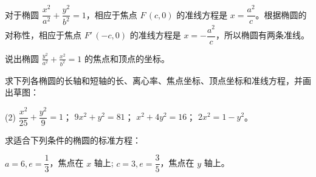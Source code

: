 对于椭圆 $\dfrac{x^2}{a^2}+\dfrac{y^2}{b^2}=1$，相应于焦点 $F\,(c,0)$ 的准线方程是 $x=\dfrac{a^2}{c}$。根据椭圆的对称性，相应于焦点 $F'\,(-c,0)$ 的准线方程是 $x=- \dfrac{a^2}{c}$，所以椭圆有两条准线。

\begin{Practice}
  \begin{question}
    \item 说出椭圆 $\frac{y^2}{a^2}+\frac{x^2}{b^2}=1$ 的焦点和顶点的坐标。
    \item 求下列各椭圆的长轴和短轴的长、离心率、焦点坐标、顶点坐标和准线方程，并画出草图：
    \begin{tasks}(2)
      \task $\dfrac{x^2}{25}+\dfrac{y^2}{9}=1$；
      \task $9x^2+y^2=81$；
      \task $x^2+4y^2=16$；
      \task $2x^2=1-y^2$。
    \end{tasks}
    \item 求适合下列条件的椭圆的标准方程：
    \begin{tasks}
      \task $a=6,e=\dfrac{1}{3}$，焦点在 $x$ 轴上;
      \task $c=3,e=\dfrac{3}{5}$，焦点在 $y$ 轴上。
    \end{tasks}
  \end{question}
\end{Practice}
